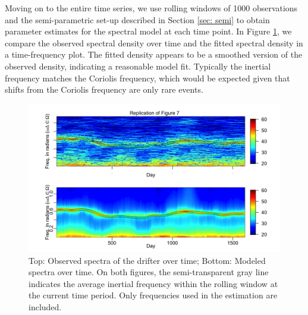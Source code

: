 \documentclass{stat572Style}
\begin{document}
\par
Moving on to the entire time series, we use rolling windows of 1000 observations and the semi-parametric set-up described in Section \ref{sec: semi}  to obtain parameter estimates for the spectral model at each time point.
 In Figure \ref{fig:timeVarying}, we compare the observed spectral density over time and the fitted spectral density in a time-frequency plot. 
  The fitted density appears to be a smoothed version of the observed density,  indicating a reasonable model fit.
   Typically the inertial frequency matches the Coriolis frequency, which would be expected given that shifts from the Coriolis frequency are only rare events.
   
   \begin{figure}[h!]
  \centering
    \includegraphics[width=\textwidth]{ReplicatedFigures/fig7.png}
        \caption{Top: Observed spectra of the drifter over time; Bottom: Modeled spectra over time. On both figures, the semi-transparent gray line indicates the average inertial frequency within the rolling window at the current time period.  Only frequencies used in the estimation are included.  }
        	\label{fig:timeVarying}
\end{figure}
\end{document}
